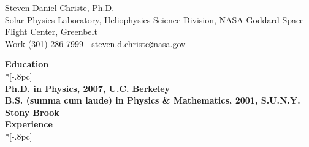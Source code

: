 \documentclass[11pt]{article}
\begin{document}
\begin{center}
{\Large Steven Daniel Christe, Ph.D.} \\[.5pc]
Solar Physics Laboratory, Heliophysics Science Division, NASA Goddard Space Flight Center, Greenbelt \\
Work (301) 286-7999 $\;$ steven.d.christe\verb|@|nasa.gov $\;$ \\[2pc]
\end{center}
\vspace{-0.2in}
{\large \bf Education} \\*[-.8pc]
\underline{\hspace{6in}} \\
{\bf Ph.D. in Physics, 2007, U.C. Berkeley} \\
{\bf B.S. (summa cum laude) in Physics \& Mathematics, 2001, S.U.N.Y. Stony Brook} \\

{\large \bf Experience} \\*[-.8pc]
\underline{\hspace{6in}}



\nocite{*}



\end{document}
